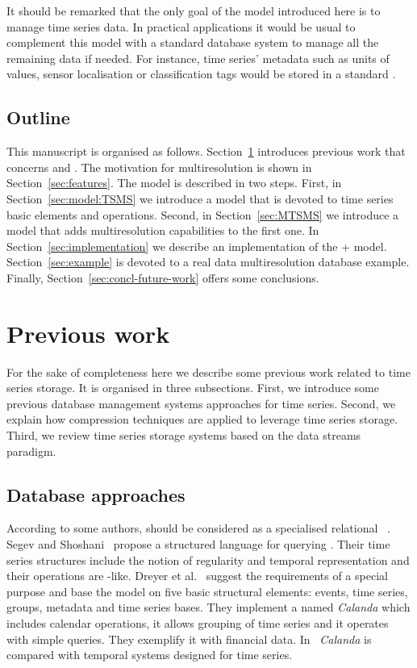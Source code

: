 It should be remarked that the only goal of the model introduced here
is to manage time series data. In practical applications it would be
usual to complement this model with a standard database system to
manage all the remaining data if needed. For instance, time series'
metadata such as units of values, sensor localisation or
classification tags would be stored in a standard .


\subsection{Outline}

This manuscript is organised as
follows. Section~\ref{sec:related-work} introduces previous work that
concerns  and .  The motivation for
multiresolution is shown in Section~\ref{sec:features}.  The model is
described in two steps.
%
First, in Section~\ref{sec:model:TSMS} we introduce a 
model that is devoted to time series basic elements and operations.
%
Second, in Section~\ref{sec:MTSMS} we introduce a  model
that adds multiresolution capabilities to the first one.
%
In Section~\ref{sec:implementation} we describe an implementation of
the + model.  Section~\ref{sec:example} is
devoted to a real data multiresolution database example.  Finally,
Section~\ref{sec:concl-future-work} offers some conclusions.




\section{Previous work}
\label{sec:related-work}

For the sake of completeness here we describe some previous work
related to time series storage. It is organised in three subsections.
First, we introduce some previous database management systems
approaches for time series. Second, we explain how compression
techniques are applied to leverage time series storage. Third, we
review time series storage systems based on the data streams paradigm.


\subsection{Database approaches}

According to some authors,  should be considered as a
specialised relational ~\cite{last01}.  Segev and
Shoshani~\cite{segev87:sigmod} propose a structured language for
querying . Their time series structures include the notion
of regularity and temporal representation and their operations are
-like.  Dreyer et al.~\cite{dreyer94} suggest the
requirements of a special purpose  and base the model on
five basic structural elements: events, time series, groups, metadata
and time series bases. They implement a  named
\emph{Calanda} which includes calendar operations, it allows grouping
of time series and it operates with simple queries. They exemplify it
with financial data. In~\cite{schmidt95} \emph{Calanda} is compared
with temporal systems designed for time series.
 
